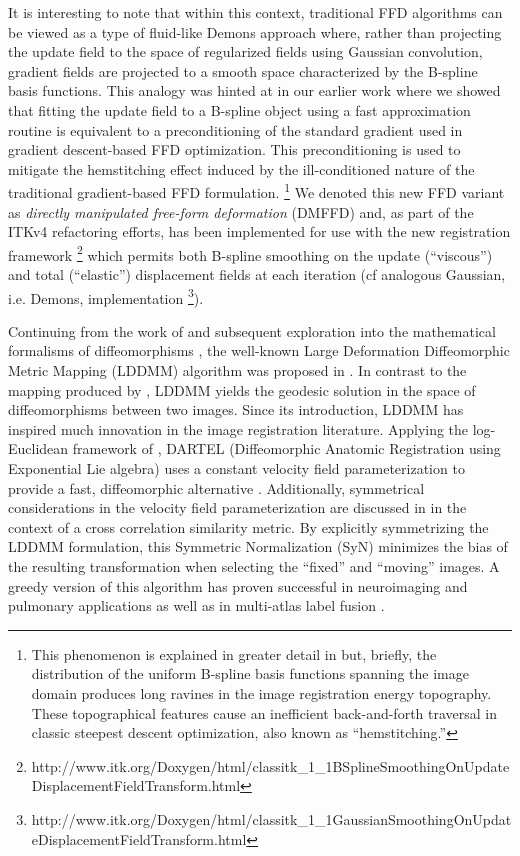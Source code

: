 \documentclass{frontiersSCNS}
\begin{document}
It is interesting to note that within this context, traditional FFD
algorithms can be viewed as a type of fluid-like Demons approach
where, rather than projecting the update field to the space of
regularized fields using Gaussian convolution, gradient fields are
projected to a smooth space characterized by the B-spline basis
functions.  This analogy was hinted at in our earlier work
\citep{tustison2009} where we showed that fitting the update field to
a B-spline object using a fast approximation routine
\citep{tustison2006} is equivalent to a preconditioning of the
standard gradient used in gradient descent-based FFD optimization.
This preconditioning is used to mitigate the hemstitching effect
induced by the ill-conditioned nature of the traditional
gradient-based FFD formulation.%
\footnote{
This phenomenon is explained in greater detail in \cite{tustison2009}
but, briefly, the distribution of the uniform B-spline basis functions
spanning the image domain produces long ravines in the image registration
energy topography.  These topographical features cause an
inefficient back-and-forth traversal in classic steepest descent optimization, also known as ``hemstitching.''
}
We denoted this new FFD variant as
{\it directly manipulated free-form deformation} (DMFFD) and, as part of the
ITKv4 refactoring efforts, has been implemented for use with the new
registration framework%
\footnote{
http://www.itk.org/Doxygen/html/classitk\_1\_1BSplineSmoothingOnUpdateDisplacementFieldTransform.html
}
which permits both B-spline smoothing on the update (``viscous'') and total (``elastic'')
displacement fields at each iteration (cf
analogous Gaussian, i.e. Demons, implementation%
\footnote{
http://www.itk.org/Doxygen/html/classitk\_1\_1GaussianSmoothingOnUpdateDisplacementFieldTransform.html
}).

Continuing from the work of \cite{christensen1996} and subsequent
exploration into the mathematical formalisms of diffeomorphisms
\citep[e.g.][]{dupuis1998}, the well-known Large Deformation
Diffeomorphic Metric Mapping (LDDMM) algorithm was proposed in
\cite{beg2005}.  In contrast to the mapping produced by
\cite{christensen1996}, LDDMM yields the geodesic solution in the
space of diffeomorphisms between two images. Since its introduction,
LDDMM has inspired much innovation in the image registration
literature.  Applying the log-Euclidean framework of
\cite{arsigny2006}, DARTEL (Diffeomorphic Anatomic Registration using
Exponential Lie algebra) uses a constant velocity field
parameterization to provide a fast, diffeomorphic alternative
\citep{ashburner2007}. Additionally, symmetrical considerations in the
velocity field parameterization are discussed in \cite{avants2008} in
the context of a cross correlation similarity metric.  By explicitly
symmetrizing the LDDMM formulation, this Symmetric Normalization (SyN)
minimizes the bias of the resulting transformation when selecting the
``fixed'' and ``moving'' images.  A greedy version of this algorithm
has proven successful in neuroimaging \citep{klein2009} and pulmonary
\citep{murphy2011} applications as well as in multi-atlas label fusion \citep{wang2012}.
\end{document}
